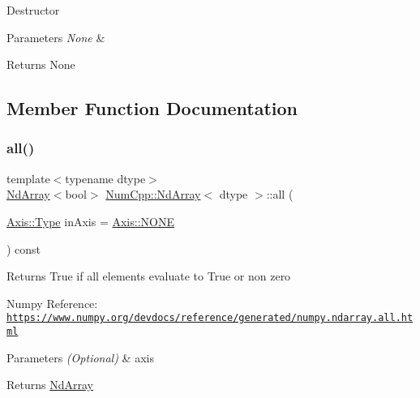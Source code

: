 Destructor


\begin{DoxyParams}{Parameters}
{\em None} & \\
\hline
\end{DoxyParams}
\begin{DoxyReturn}{Returns}
None 
\end{DoxyReturn}


\subsection{Member Function Documentation}
\mbox{\label{class_num_cpp_1_1_nd_array_ac7a89651bc2ca74087bc9fc9f3a28171}} 
\subsubsection{\texorpdfstring{all()}{all()}}
{\footnotesize\ttfamily template$<$typename dtype$>$ \\
\mbox{\hyperlink{class_num_cpp_1_1_nd_array}{Nd\+Array}}$<$bool$>$ \mbox{\hyperlink{class_num_cpp_1_1_nd_array}{Num\+Cpp\+::\+Nd\+Array}}$<$ dtype $>$\+::all (\begin{DoxyParamCaption}\item[{\mbox{\hyperlink{struct_num_cpp_1_1_axis_ac10eb76f8631762d9ed70c40c42ca6cb}{Axis\+::\+Type}}}]{in\+Axis = {\ttfamily \mbox{\hyperlink{struct_num_cpp_1_1_axis_ac10eb76f8631762d9ed70c40c42ca6cba747ae657022cca1d87702b56d0c038e9}{Axis\+::\+N\+O\+NE}}} }\end{DoxyParamCaption}) const\hspace{0.3cm}{\ttfamily [inline]}}

Returns True if all elements evaluate to True or non zero

Numpy Reference\+: \href{https://www.numpy.org/devdocs/reference/generated/numpy.ndarray.all.html}{\tt https\+://www.\+numpy.\+org/devdocs/reference/generated/numpy.\+ndarray.\+all.\+html}


\begin{DoxyParams}{Parameters}
{\em (\+Optional)} & axis \\
\hline
\end{DoxyParams}
\begin{DoxyReturn}{Returns}
\mbox{\hyperlink{class_num_cpp_1_1_nd_array}{Nd\+Array}} 
\end{DoxyReturn}
\mbox{\label{class_num_cpp_1_1_nd_array_aeac5ed3db755e2e9189b840b80506855}} 
